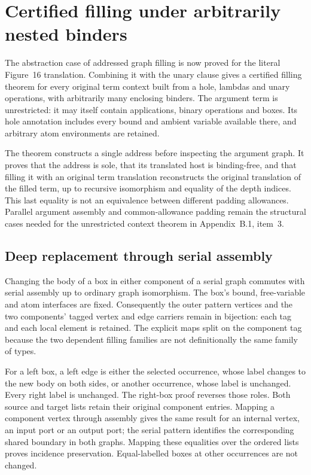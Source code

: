 \clearpage
\section{Certified filling under arbitrarily nested binders}
\label{sec:copying-nested-filling}
The abstraction case of addressed graph filling is now proved for the literal
Figure~16 translation. Combining it with the unary clause gives a certified
filling theorem for every original term context built from a hole, lambdas and
unary operations, with arbitrarily many enclosing binders. The argument term
is unrestricted: it may itself contain applications, binary operations and
boxes. Its hole annotation includes every bound and ambient variable available
there, and arbitrary atom environments are retained.

The theorem constructs a single address before inspecting the argument graph.
It proves that the address is sole, that its translated host is binding-free,
and that filling it with an original term translation reconstructs the original
translation of the filled term, up to recursive isomorphism and equality of
the depth indices. This last equality is not an equivalence between different
padding allowances. Parallel argument assembly and common-allowance padding
remain the structural cases needed for the unrestricted context theorem in
Appendix~B.1, item~3.

\subsection{Deep replacement through serial assembly}


Changing the body of a box in either component of a serial graph commutes
with serial assembly up to ordinary graph isomorphism. The box's bound,
free-variable and atom interfaces are fixed. Consequently the outer pattern
vertices and the two components' tagged vertex and edge carriers remain in
bijection: each tag and each local element is retained. The explicit maps
split on the component tag because the two dependent filling families are
not definitionally the same family of types.

For a left box, a left edge is either the selected occurrence, whose label
changes to the new body on both sides, or another occurrence, whose label is
unchanged. Every right label is unchanged. The right-box proof reverses those
roles. Both source and target lists retain their original component entries.
Mapping a component vertex through assembly gives the same result for an
internal vertex, an input port or an output port; the serial pattern identifies
the corresponding shared boundary in both graphs. Mapping these equalities
over the ordered lists proves incidence preservation. Equal-labelled boxes
at other occurrences are not changed.


